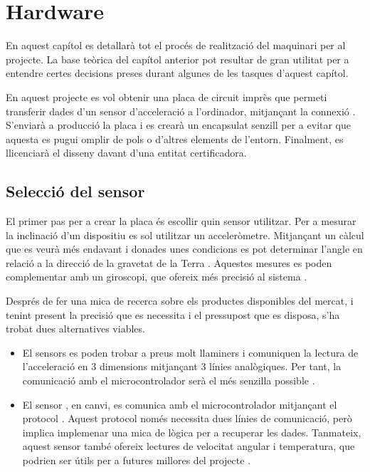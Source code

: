 \chapter{Hardware}

En aquest capítol es detallarà tot el procés de realització del maquinari per
al projecte. La base teòrica del capítol anterior pot resultar de gran utilitat
per a entendre certes decisions preses durant algunes de les tasques d'aquest
capítol.

En aquest projecte es vol obtenir una placa de circuit imprès que permeti
transferir dades d'un sensor d'acceleració a l'ordinador, mitjançant la connexió
. S'enviarà a producció la placa i es crearà un encapsulat senzill per
a evitar que aquesta es pugui omplir de pols o d'altres elements de l'entorn.
Finalment, es llicenciarà el disseny davant d'una entitat certificadora.

\section{Selecció del sensor}
\label{sec:sensor_selection}

El primer pas per a crear la placa és escollir quin sensor utilitzar. Per a
mesurar la inclinació d'un dispositiu es sol utilitzar un acceleròmetre.
Mitjançant un càlcul que es veurà més endavant i donades unes condicions es pot
determinar l'angle en relació a la direcció de la gravetat de la Terra
\cite{PedleyTilt}.
Aquestes mesures es poden complementar amb un giroscopi, que ofereix més
precisió al sistema \cite{6702711}.

Després de fer una mica de recerca sobre els productes disponibles del mercat,
i tenint present la precisió que es necessita i el pressupost que es disposa,
s'ha trobat dues alternatives viables.

\begin{itemize}
    \item El sensors  es poden trobar a preus molt llaminers i
    comuniquen la lectura de l'acceleració en 3 dimensions mitjançant 3 línies
    analògiques. Per tant, la comunicació amb el microcontrolador serà el més
    senzilla possible \cite{adxl335}.
    \item El sensor , en canvi, es comunica amb el microcontrolador
    mitjançant el protocol . Aquest protocol només necessita dues
    línies de comunicació, però implica implemenar una mica de lògica per a
    recuperar les dades. Tanmateix, aquest sensor també ofereix lectures de
    velocitat angular i temperatura, que podrien ser útils per a futures
    millores del projecte \cite{mpu6050specs}.
\end{itemize}

